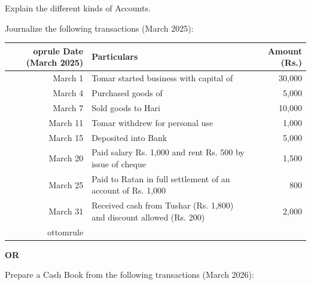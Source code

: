 \documentclass[11pt,a4paper]{article}
\begin{document}
\begin{parts}
  \item Explain the different kinds of Accounts.
  \item Journalize the following transactions (March 2025):
  
\begin{center}
  \small
  
\begin{tabular}{r p{9cm} r}
   oprule
   \textbf{Date (March 2025)} &   \textbf{Particulars} &   \textbf{Amount (Rs.)} \\
  \midrule
  March 1 & Tomar started business with capital of & 30,000 \\
  March 4 & Purchased goods of & 5,000 \\
  March 7 & Sold goods to Hari & 10,000 \\
  March 11 & Tomar withdrew for personal use & 1,000 \\
  March 15 & Deposited into Bank & 5,000 \\
  March 20 & Paid salary Rs. 1,000 and rent Rs. 500 by issue of cheque & 1,500 \\
  March 25 & Paid to Ratan in full settlement of an account of Rs. 1,000 & 800 \\
  March 31 & Received cash from Tushar (Rs. 1,800) and discount allowed (Rs. 200) & 2,000 \\
  ottomrule
  \end{tabular}
  \end{center}
\end{parts}


\begin{center}   \textbf{OR}\end{center}

Prepare a Cash Book from the following transactions (March 2026):
\end{document}
